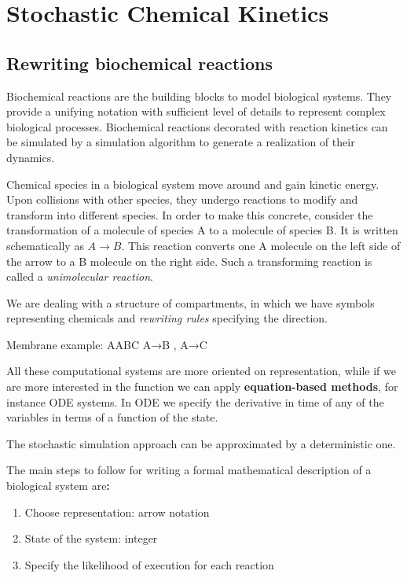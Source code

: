 \graphicspath{{chapters/02/}}
\chapter{Stochastic Chemical Kinetics}

\hypertarget{rewriting-biochemical-reactions}{%
\section{Rewriting biochemical
reactions}\label{rewriting-biochemical-reactions}}

Biochemical reactions are the building blocks to model biological
systems. They provide a unifying notation with sufficient level of
details to represent complex biological processes. Biochemical reactions
decorated with reaction kinetics can be simulated by a simulation
algorithm to generate a realization of their dynamics.

Chemical species in a biological system move around and gain kinetic
energy. Upon collisions with other species, they undergo reactions to
modify and transform into different species. In order to make this
concrete, consider the transformation of a molecule of species A to a
molecule of species B. It is written schematically as $A \rightarrow B$.
This reaction converts one A molecule on the left side of the arrow to a
B molecule on the right side. Such a transforming reaction is called a
\emph{unimolecular reaction}.

We are dealing with a structure of compartments, in which we have
symbols representing chemicals and \emph{rewriting rules} specifying the
direction.

Membrane example: AABC A→B , A→C

All these computational systems are more oriented on representation,
while if we are more interested in the function we can apply
\textbf{equation-based methods}, for instance ODE systems. In ODE we
specify the derivative in time of any of the variables in terms of a
function of the state.

The stochastic simulation approach can be approximated by a
deterministic one.

The main steps to follow for writing a formal mathematical description
of a biological system are\textbf{:}

\begin{enumerate}
\def\labelenumi{\arabic{enumi}.}
\tightlist
\item
  Choose representation: arrow notation
\item
  State of the system: integer
\item
  Specify the likelihood of execution for each reaction
\end{enumerate}

